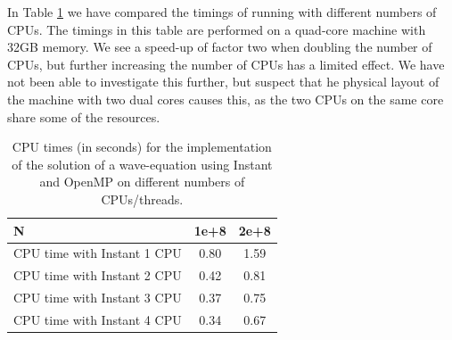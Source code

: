 In Table \ref{speed-up2} we have compared the timings of running with
different numbers of CPUs. The timings in this table are performed on a
quad-core machine with 32GB memory. We see a speed-up of factor two when doubling the
number of CPUs, but further increasing the number of CPUs has a limited
effect. We have not been able to investigate this further, but suspect that
he physical layout of the machine with two dual cores causes this, as the two
CPUs on the same core share some of the resources.
\begin{table}[h]
\begin{center}
\begin{tabular}{|l|c|c|} \hline
N                     & 1e+8     &2e+8 \\ \hline
CPU time with Instant 1 CPU & 0.80  & 1.59  \\ \hline
CPU time with Instant 2 CPU & 0.42  & 0.81  \\ \hline
CPU time with Instant 3 CPU & 0.37  & 0.75  \\ \hline
CPU time with Instant 4 CPU & 0.34  & 0.67  \\ \hline
\end{tabular}
\caption{CPU times (in seconds) for the implementation of the solution of a wave-equation 
using Instant and OpenMP on different numbers of CPUs/threads.}
\label{speed-up2}
\end{center}
\end{table}

